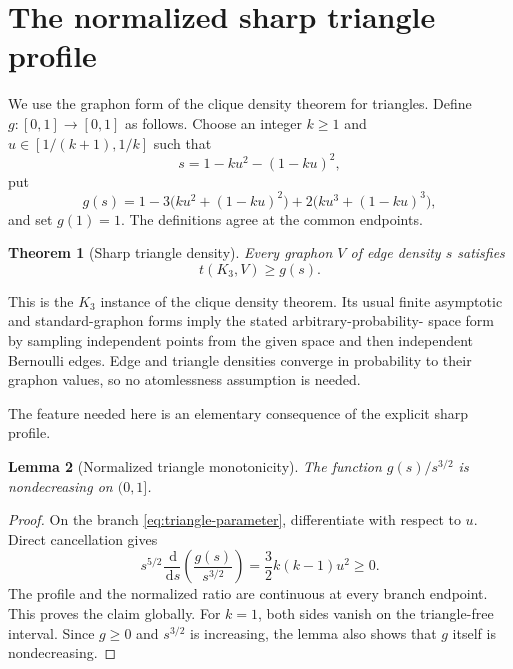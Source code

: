 \documentclass[11pt]{article}
\newtheorem{theorem}{Theorem}[section]
\newtheorem{lemma}[theorem]{Lemma}
\newcommand{\dd}{\,\mathrm d}
\begin{document}
\section{The normalized sharp triangle profile}

We use the graphon form of the clique density theorem for triangles.  Define
$g\colon[0,1]\to[0,1]$ as follows.  Choose an integer $k\geq1$ and
$u\in[1/(k+1),1/k]$ such that
\begin{equation}
 s=1-ku^2-(1-ku)^2,
 \label{eq:triangle-parameter}
\end{equation}
put
\begin{equation}
 g(s)=1-3\bigl(ku^2+(1-ku)^2\bigr)
       +2\bigl(ku^3+(1-ku)^3\bigr),
 \label{eq:triangle-profile}
\end{equation}
and set $g(1)=1$.  The definitions agree at the common endpoints.

\begin{theorem}[Sharp triangle density]
\label{thm:clique-density}
Every graphon $V$ of edge density $s$ satisfies
\[
 t(K_3,V)\geq g(s).
\]
\end{theorem}

This is the $K_3$ instance of the clique density theorem.  Its usual finite
asymptotic and standard-graphon forms imply the stated arbitrary-probability-
space form by sampling independent points from the given space and then
independent Bernoulli edges.  Edge and triangle densities converge in
probability to their graphon values, so no atomlessness assumption is needed.

The feature needed here is an elementary consequence of the explicit sharp
profile.

\begin{lemma}[Normalized triangle monotonicity]
\label{lem:normalized-triangle}
The function $g(s)/s^{3/2}$ is nondecreasing on $(0,1]$.
\end{lemma}

\begin{proof}
On the branch \eqref{eq:triangle-parameter}, differentiate with respect to
$u$.  Direct cancellation gives
\[
 s^{5/2}\frac{\dd}{\dd s}\left(\frac{g(s)}{s^{3/2}}\right)
 =\frac32 k(k-1)u^2\geq0.
\]
The profile and the normalized ratio are continuous at every branch
endpoint.  This proves the claim globally.  For $k=1$, both sides vanish on
the triangle-free interval.  Since $g\geq0$ and $s^{3/2}$ is increasing, the
lemma also shows that $g$ itself is nondecreasing.
\end{proof}
\end{document}
